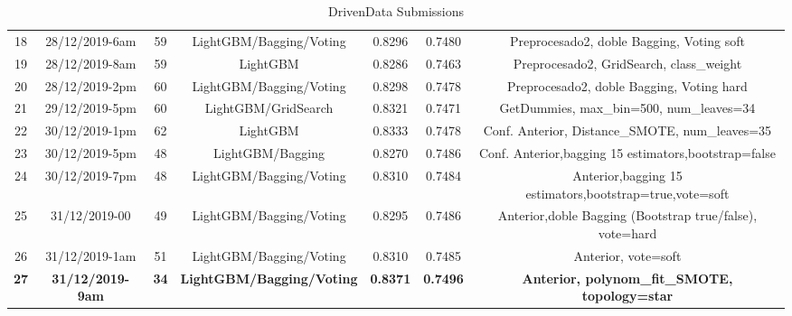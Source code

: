 \begin{table}[H]
{\begin{tabular}{ccccccc}
				18                  & 28/12/2019-6am          & 59            & LightGBM/Bagging/Voting          & 0.8296             & 0.7480             & Preprocesado2, doble Bagging, Voting soft                \\
				19                  & 28/12/2019-8am          & 59            & LightGBM                         & 0.8286             & 0.7463             & Preprocesado2, GridSearch, class\_weight                 \\
				20                  & 28/12/2019-2pm          & 60            & LightGBM/Bagging/Voting          & 0.8298             & 0.7478             & Preprocesado2, doble Bagging, Voting hard                \\
				21                  & 29/12/2019-5pm          & 60            & LightGBM/GridSearch              & 0.8321             & 0.7471             & GetDummies, max\_bin=500, num\_leaves=34                 \\
				22                  & 30/12/2019-1pm          & 62            & LightGBM                         & 0.8333             & 0.7478             & Conf. Anterior, Distance\_SMOTE, num\_leaves=35          \\
				23                  & 30/12/2019-5pm          & 48            & LightGBM/Bagging                 & 0.8270             & 0.7486             & Conf. Anterior,bagging 15 estimators,bootstrap=false     \\
				24                  & 30/12/2019-7pm          & 48            & LightGBM/Bagging/Voting          & 0.8310             & 0.7484             & Anterior,bagging 15 estimators,bootstrap=true,vote=soft  \\
				25                  & 31/12/2019-00           & 49            & LightGBM/Bagging/Voting          & 0.8295             & 0.7486             & Anterior,doble Bagging (Bootstrap true/false), vote=hard \\
				26                  & 31/12/2019-1am          & 51            & LightGBM/Bagging/Voting          & 0.8310             & 0.7485             & Anterior, vote=soft                                      \\
				\textbf{27}         & \textbf{31/12/2019-9am} & \textbf{34}   & \textbf{LightGBM/Bagging/Voting} & \textbf{0.8371}    & \textbf{0.7496}    & \textbf{Anterior, polynom\_fit\_SMOTE, topology=star}    \\ \hline
			\end{tabular}%
		}
		\caption{DrivenData Submissions}
		\label{tab:my-table}
	\end{table}
	
